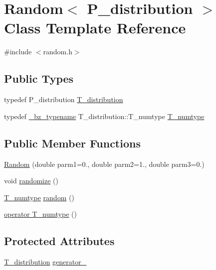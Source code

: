 \hypertarget{classRandom}{}\section{Random$<$ P\+\_\+distribution $>$ Class Template Reference}
\label{classRandom}


{\ttfamily \#include $<$random.\+h$>$}

\subsection*{Public Types}
\begin{DoxyCompactItemize}
\item 
typedef P\+\_\+distribution \hyperlink{classRandom_ae8a9b68164901d4edcc47f1fd7bf5fcf}{T\+\_\+distribution}
\item 
typedef \hyperlink{compiler_8h_a1bc40add3e72effc9cf69dbe445cbdfd}{\+\_\+bz\+\_\+typename} T\+\_\+distribution\+::\+T\+\_\+numtype \hyperlink{classRandom_ab93dcd40486dee5d190ead368dbe4414}{T\+\_\+numtype}
\end{DoxyCompactItemize}
\subsection*{Public Member Functions}
\begin{DoxyCompactItemize}
\item 
\hyperlink{classRandom_a2e19d676e1fd49f110b57e44b16aa681}{Random} (double parm1=0., double parm2=1., double parm3=0.)
\item 
void \hyperlink{classRandom_a4dd0af309c3e5a6148a4d3e2edc85ff7}{randomize} ()
\item 
\hyperlink{classRandom_ab93dcd40486dee5d190ead368dbe4414}{T\+\_\+numtype} \hyperlink{classRandom_a2d738bb02046afb490ae627068012d25}{random} ()
\item 
\hyperlink{classRandom_ab34ff9e00f14d375c5c52f6fcc3c4ef4}{operator T\+\_\+numtype} ()
\end{DoxyCompactItemize}
\subsection*{Protected Attributes}
\begin{DoxyCompactItemize}
\item 
\hyperlink{classRandom_ae8a9b68164901d4edcc47f1fd7bf5fcf}{T\+\_\+distribution} \hyperlink{classRandom_a31e29edc3f3d9aff69a5f0735c0ad13e}{generator\+\_\+}
\end{DoxyCompactItemize}


